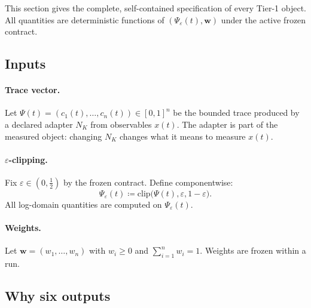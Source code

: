 \documentclass[
  aps,
  prd,
  twocolumn,
  superscriptaddress,
  nofootinbib,
  floatfix
]{revtex4-2}
\newcommand{\eps}{\varepsilon}
\newcommand{\beq}{\begin{equation}}
\newcommand{\eeq}{\end{equation}}
\newcommand{\wvec}{\mathbf{w}}
\begin{document}
This section gives the complete, self-contained specification of
every Tier-1 object.  All quantities are deterministic functions
of $(\Psi_\eps(t), \wvec)$ under the active frozen contract.

\subsection{Inputs}

\paragraph{Trace vector.}
Let $\Psi(t) = (c_1(t), \ldots, c_n(t)) \in [0,1]^n$ be the
bounded trace produced by a declared adapter $N_K$ from observables
$x(t)$.  The adapter is part of the measured object: changing
$N_K$ changes what it means to measure $x(t)$.

\paragraph{$\eps$-clipping.}
Fix $\eps \in (0, \tfrac{1}{2})$ by the frozen contract.  Define
componentwise:
\beq
  \Psi_\eps(t) \coloneqq
  \mathrm{clip}\bigl(\Psi(t), \eps, 1-\eps\bigr).
\eeq
All log-domain quantities are computed on $\Psi_\eps(t)$.

\paragraph{Weights.}
Let $\wvec = (w_1, \ldots, w_n)$ with $w_i \geq 0$ and
$\sum_{i=1}^n w_i = 1$.  Weights are frozen within a run.

\subsection{Why six outputs}
\end{document}
